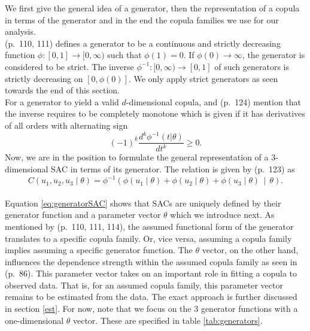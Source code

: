 \documentclass[
]{krantz}
\begin{document}
We first give the general idea of a generator, then the
representation of a copula in terms of the generator and in the end the
copula families we use for our analysis.\\
\citet{nelsen2006} (p.~110, 111) defines a generator to be a
continuous and strictly decreasing function
\(\phi: [0, 1] \to [0, \infty)\) such that \(\phi(1) = 0\).
If \(\phi(0) \to \infty\), the generator is considered to be strict.
The inverse \(\phi^{-1}:[0, \infty) \to [0, 1]\) of such generators is
strictly decreasing on \([0, \phi(0)]\).
We only apply strict generators as seen towards the end of this section.\\
For a generator to yield a valid \(d\)-dimensional copula,
\citet{grimaldi2006} and \citet{zhang2019} (p.~124) mention that the inverse
requires to be completely monotone which is given if it has
derivatives of all orders with alternating sign\\
\[
(-1)^k \frac{d^k \phi^{-1}(t|\theta)}{dt^k} \geq 0.
\label{eq:changingsign}
\]
Now, we are in the position to formulate the general representation of a
\(3\)-dimensional SAC in terms of its generator.
The relation is given by
\citet{zhang2019} (p.~123) as\\
\[
C(u_1, u_2, u_3 \mid \theta) = \phi^{-1} \left( \phi(u_1 \mid \theta) + \phi(u_2 \mid \theta) + \phi(u_3 \mid \theta) \,\middle|\, \theta \right).
\label{eq:generatorSAC}
\]\\
Equation \eqref{eq:generatorSAC} shows that
SACs are uniquely defined by their generator
function and a parameter vector \(\theta\) which we introduce next.
As mentioned by \citet{nelsen2006} (p.~110, 111, 114), the
assumed functional form of the generator translates to a specific copula
family. Or, vice versa, assuming a copula family implies assuming a specific generator function.
The \(\theta\) vector, on the other hand,
influences the dependence strength within the assumed copula family
as seen in \citet{zhang2019} (p.~86).
This parameter vector takes on an important role in fitting a copula to observed data.
That is, for an assumed copula family, this parameter vector remains to be estimated from the data.
The exact approach is further discussed in section \ref{est}.
For now, note that we focus on the \(3\) generator functions with a one-dimensional \(\theta\) vector.
These are specified in table \ref{tab:generators}.
\end{document}
